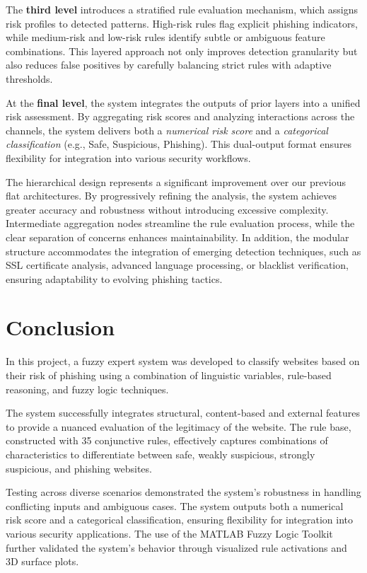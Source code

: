 \documentclass{article}
\begin{document}
The \textbf{third level} introduces a stratified rule evaluation mechanism, which assigns risk profiles to detected patterns. High-risk rules flag explicit phishing indicators, while medium-risk and low-risk rules identify subtle or ambiguous feature combinations. This layered approach not only improves detection granularity but also reduces false positives by carefully balancing strict rules with adaptive thresholds.

At the \textbf{final level}, the system integrates the outputs of prior layers into a unified risk assessment. By aggregating risk scores and analyzing interactions across the channels, the system delivers both a \textit{numerical risk score} and a \textit{categorical classification} (e.g., Safe, Suspicious, Phishing). This dual-output format ensures flexibility for integration into various security workflows.

The hierarchical design represents a significant improvement over our previous flat architectures. By progressively refining the analysis, the system achieves greater accuracy and robustness without introducing excessive complexity. Intermediate aggregation nodes streamline the rule evaluation process, while the clear separation of concerns enhances maintainability. In addition, the modular structure accommodates the integration of emerging detection techniques, such as SSL certificate analysis, advanced language processing, or blacklist verification, ensuring adaptability to evolving phishing tactics.

\section{Conclusion}

In this project, a fuzzy expert system was developed to classify websites based on their risk of phishing using a combination of linguistic variables, rule-based reasoning, and fuzzy logic techniques.

The system successfully integrates structural, content-based and external features to provide a nuanced evaluation of the legitimacy of the website. The rule base, constructed with 35 conjunctive rules, effectively captures combinations of characteristics to differentiate between safe, weakly suspicious, strongly suspicious, and phishing websites.

Testing across diverse scenarios demonstrated the system's robustness in handling conflicting inputs and ambiguous cases. The system outputs both a numerical risk score and a categorical classification, ensuring flexibility for integration into various security applications. The use of the MATLAB Fuzzy Logic Toolkit further validated the system's behavior through visualized rule activations and 3D surface plots.
\end{document}
